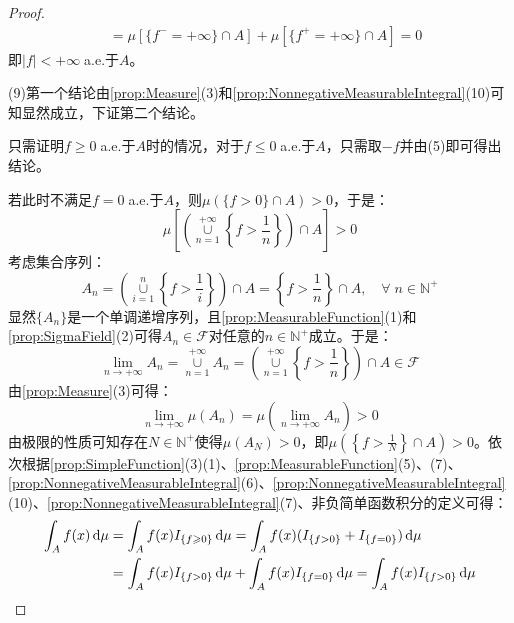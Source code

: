 \begin{proof}
\begin{align*}
		&=\mu[\{f^-=+\infty\}\cap A]+\mu[\{f^+=+\infty\}\cap A]=0
	\end{align*}
	即$|f|<+\infty\;$a.e.于$A$。\par
	(9)第一个结论由\cref{prop:Measure}(3)和\cref{prop:NonnegativeMeasurableIntegral}(10)可知显然成立，下证第二个结论。\par
	只需证明$f\geqslant0\;$a.e.于$A$时的情况，对于$f\leqslant0\;$a.e.于$A$，只需取$-f$并由(5)即可得出结论。\par
	若此时不满足$f=0\;$a.e.于$A$，则$\mu(\{f>0\}\cap A)>0$，于是：
	\begin{equation*}
		\mu\left[\left(\underset{n=1}{\overset{+\infty}{\cup}}\left\{f>\frac{1}{n}\right\}\right)\cap A\right]>0
	\end{equation*}
	考虑集合序列：
	\begin{equation*}
		A_n=\left(\underset{i=1}{\overset{n}{\cup}}\left\{f>\frac{1}{i}\right\}\right)\cap A=\left\{f>\frac{1}{n}\right\}\cap A,\quad\forall\;n\in\mathbb{N}^+
	\end{equation*}
	显然$\{A_n\}$是一个单调递增序列，且\cref{prop:MeasurableFunction}(1)和\cref{prop:SigmaField}(2)可得$A_n\in\mathscr{F}$对任意的$n\in\mathbb{N}^+$成立。于是：
	\begin{equation*}
		\lim_{n\to+\infty}A_n=\underset{n=1}{\overset{+\infty}{\cup}}A_n=\left(\underset{n=1}{\overset{+\infty}{\cup}}\left\{f>\frac{1}{n}\right\}\right)\cap A\in\mathscr{F}
	\end{equation*}
	由\cref{prop:Measure}(3)可得：
	\begin{equation*}
		\lim_{n\to+\infty}\mu(A_n)=\mu\left(\lim_{n\to+\infty}A_n\right)>0
	\end{equation*}
	由极限的性质可知存在$N\in\mathbb{N}^+$使得$\mu(A_N)>0$，即$\mu\left(\left\{f>\frac{1}{N}\right\}\cap A\right)>0$。依次根据\cref{prop:SimpleFunction}(3)(1)、\cref{prop:MeasurableFunction}(5)、(7)、\cref{prop:NonnegativeMeasurableIntegral}(6)、\cref{prop:NonnegativeMeasurableIntegral}(10)、\cref{prop:NonnegativeMeasurableIntegral}(7)、非负简单函数积分的定义可得：
	\begin{align*}
		\int_{A}f(x)\dif\mu&=\int_{A}f(x)I_{\{f\geqslant0\}}\dif\mu=\int_{A}f(x)(I_{\{f>0\}}+I_{\{f=0\}})\dif\mu \\
		&=\int_{A}f(x)I_{\{f>0\}}\dif\mu+\int_{A}f(x)I_{\{f=0\}}\dif\mu=\int_{A}f(x)I_{\{f>0\}}\dif\mu \\

\end{align*}
\end{proof}
